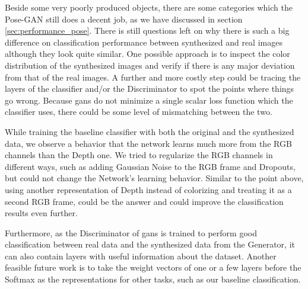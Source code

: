 Beside some very poorly produced objects, there are some categories which the Pose-GAN
still does a decent job, as we have discussed in section \ref{sec:performance_pose}. There
is still questions left on why there is such a big difference on classification
performance between synthesized and real images although they look quite similar. One
possible approach is to inspect the color distribution of the synthesized images and
verify if there is any major deviation from that of the real images. A further and more
costly step could be tracing the layers of the classifier and/or the Discriminator to spot
the points where things go wrong. Because \acrshort{gan}s do not minimize a single scalar
loss function which the classifier uses, there could be some level of mismatching between
the two.

While training the baseline classifier with both the original and the synthesized data, we
observe a behavior that the network learns much more from the RGB channels than the Depth
one. We tried to regularize the RGB channels in different ways, such as adding Gaussian
Noise to the RGB frame and Dropouts, but could not change the Network's learning behavior.
Similar to the point above, using another representation of Depth instead of colorizing
and treating it as a second RGB frame, could be the answer and could improve the
classification results even further.

Furthermore, as the Discriminator of \acrshort{gan}s is trained to perform good
classification between real data and the synthesized data from the Generator, it can also
contain layers with useful information about the dataset. Another feasible future work is
to take the weight vectors of one or a few layers before the Softmax as the
representations for other tasks, such as our baseline classification.

